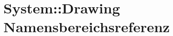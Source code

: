 \hypertarget{namespaceSystem_1_1Drawing}{
\section{System::Drawing Namensbereichsreferenz}
\label{namespaceSystem_1_1Drawing}
}




